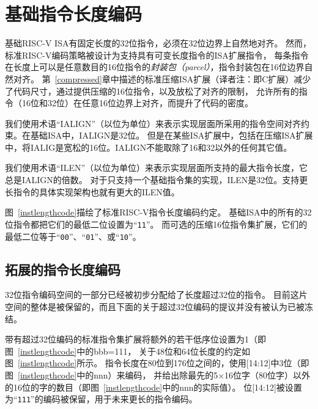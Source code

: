 \section{基础指令长度编码}

基础RISC-V ISA有固定长度的32位指令，必须在32位边界上自然地对齐。
然而，标准RISC-V编码策略被设计为支持具有可变长度指令的ISA扩展指令，
每条指令在长度上可以是任意数目的16位指令的{\em 封装包（parcel）}，指令封装包在16位边界自然对齐。
第~\ref{compressed}章中描述的标准压缩ISA扩展（译者注：即C扩展）减少了代码尺寸，通过提供压缩的16位指令，以及放松了对齐的限制，
允许所有的指令（16位和32位）在任意16位边界上对齐，而提升了代码的密度。

我们使用术语“IALIGN”（以位为单位）来表示实现层面所采用的指令空间对齐约束。在基础ISA中，IALIGN是32位。
但是在某些ISA扩展中，包括在压缩ISA扩展中，将IALIG是宽松的16位。IALIGN不能取除了16和32以外的任何其它值。

我们使用术语“ILEN”（以位为单位）来表示实现层面所支持的最大指令长度，它总是IALIGN的倍数。
对于只支持一个基础指令集的实现，ILEN是32位。支持更长指令的具体实现架构也就有更大的ILEN值。

图~\ref{instlengthcode}描绘了标准RISC-V指令长度编码约定。
基础ISA中的所有的32位指令都把它们的最低二位设置为“{\tt 11}”。
而可选的压缩16位指令集扩展，它们的最低二位等于“{\tt 00}”、“{\tt 01}”、或“{\tt 10}”。

\subsection*{拓展的指令长度编码}

32位指令编码空间的一部分已经被初步分配给了长度超过32位的指令。
目前这片空间的整体是被保留的，而且下面的关于超过32位编码的提议并没有被认为已被冻结。

带有超过32位编码的标准指令集扩展将额外的若干低序位设置为1（即图~\ref{instlengthcode}中的bbb=111，
关于48位和64位长度的约定如图~\ref{instlengthcode}所示。
指令长度在80位到176位之间的，使用[14:12]中3位（即图~\ref{instlengthcode}中的nnn）来编码，
并给出除最先的5$\times$16位字（80位字）以外的16位的字的数目（即图~\ref{instlengthcode}中的nnn的实际值）。
位[14:12]被设置为“{\tt 111}”的编码被保留，用于未来更长的指令编码。



